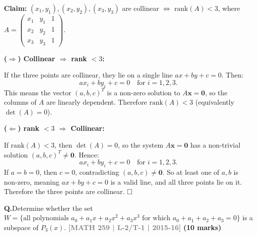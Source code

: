\documentclass[12pt,a3paper]{article}
\newcommand{\yr}[1]{\hfill\textcolor{gray}{\small\textbf{[#1]}}}
\newcommand{\mk}[1]{\textcolor{orange!70!black}{\small\textbf{(#1 marks)}}}
\newcounter{qnum}
\newcommand{\Q}[1]{%
  \needspace{4\baselineskip}
  \refstepcounter{qnum}
  \vspace{6pt}
  \noindent\textbf{Q\theqnum.}\enspace #1\par
}
\begin{document}
\begin{tcolorbox}[enhanced,breakable,colback=cC!4,colframe=cC,
  boxrule=0.8pt,arc=5pt,
  title={\textbf{Answer}},
  fonttitle=\bfseries\color{white},colbacktitle=cC]

\textbf{Claim:} $(x_1,y_1),(x_2,y_2),(x_3,y_3)$ are collinear $\iff$ $\mathrm{rank}(A)<3$, where
$A=\begin{pmatrix}x_1&y_1&1\\x_2&y_2&1\\x_3&y_3&1\end{pmatrix}$.

\medskip
\textbf{($\Rightarrow$) Collinear $\Rightarrow$ rank $< 3$:}

If the three points are collinear, they lie on a single line $ax+by+c=0$.  Then:
\[
  ax_i + by_i + c = 0 \quad\text{for }i=1,2,3.
\]
This means the vector $(a,b,c)^T$ is a non-zero solution to $A\mathbf{x}=\mathbf{0}$, so the columns of $A$ are linearly dependent.  Therefore $\mathrm{rank}(A)<3$ (equivalently $\det(A)=0$).

\medskip
\textbf{($\Leftarrow$) rank $< 3$ $\Rightarrow$ Collinear:}

If $\mathrm{rank}(A)<3$, then $\det(A)=0$, so the system $A\mathbf{x}=\mathbf{0}$ has a non-trivial solution $(a,b,c)^T\neq\mathbf{0}$.  Hence:
\[
  ax_i + by_i + c = 0 \quad\text{for }i=1,2,3.
\]
If $a=b=0$, then $c=0$, contradicting $(a,b,c)\neq\mathbf{0}$.  So at least one of $a,b$ is non-zero, meaning $ax+by+c=0$ is a valid line, and all three points lie on it.  Therefore the three points are collinear. $\hfill\square$
\end{tcolorbox}

\Q{Determine whether the set $W = \{\text{all polynomials } a_0 + a_1 x + a_2 x^2 + a_3 x^3 \text{ for which } a_0 + a_1 + a_2 + a_3 = 0\}$ is a subspace of $P_3(x)$.
\yr{MATH 259 | L-2/T-1 | 2015-16} \mk{10}}
\end{document}

